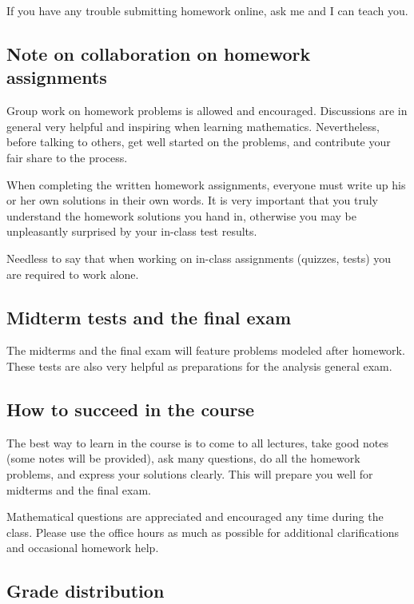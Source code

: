 \documentclass[oneside,11pt]{amsart}
\begin{document}
If you have any trouble submitting homework online, ask me and I can teach you.

\subsection*{Note on collaboration on homework assignments}
\label{collaboration}

Group work on homework problems is allowed and encouraged.
Discussions are in general very
helpful and inspiring when learning mathematics.
Nevertheless, before talking to others, get well started
on the problems, and contribute your fair share to the process.

When completing the written homework assignments, everyone must write up his or her own
solutions in their own words.
It is very important that you truly understand the homework solutions you hand
in, otherwise you may be unpleasantly surprised by your in-class test results.

Needless to say that when working on in-class assignments (quizzes, tests)
you are required to work alone.

\subsection{Midterm tests and the final exam}

The midterms and the final exam will feature
problems modeled after homework.
These tests are also very helpful as preparations 
for the analysis general exam.

\subsection{How to succeed in the course}

The best way to learn in the course is to come to all lectures, take good notes
(some notes will be provided),
ask many questions,
do all the homework problems, and express your solutions
clearly.
This will prepare you well for midterms and the final exam.

Mathematical questions are appreciated and encouraged any time during the
class. Please use the office hours as much as possible for additional
clarifications and occasional homework help.

\subsection{Grade distribution}
\end{document}
